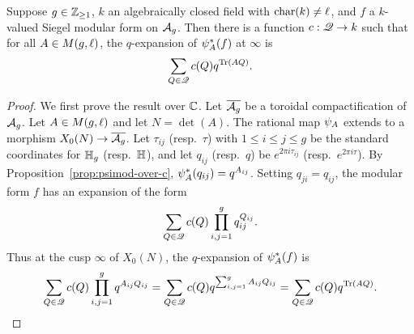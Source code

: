 \documentclass{amsart}
\begin{document}
\begin{proposition}\label{prop:q-expansion}
  Suppose  $g \in \mathbb{Z}_{\ge 1}$, $k$ an algebraically closed field with $\operatorname{char}(k) \neq \ell$, %
  and $f$ a $k$-valued Siegel modular form on $\mathcal{A}_g$.
  Then there is a function  $c : \mathscr{Q} \to k$ such that for all %
  $A \in M(g,\ell)$, the $q$-expansion of
  $\psi_{A}^*(f)$ at $\infty$ is
  \begin{equation}
    \sum_{Q \in \mathscr{Q}} c(Q) q^{\operatorname{Tr}(AQ)}.\label{eq:q}
  \end{equation}
\end{proposition}

\begin{proof}
  We first prove the result over $\mathbb{C}$. Let $\overline{\mathcal{A}_g}$ be a toroidal compactification of $\mathcal{A}_g$. Let $A \in M(g,\ell)$ and let $N=\det(A)$. The rational map $\psi_{A}$ extends to a morphism $X_0(N) \to \overline{\mathcal{A}_g}$. Let $\tau_{ij}$ (resp.~$\tau$) with $1 \leq i \leq j \leq g$ be the standard coordinates for $\mathbb{H}_g$ (resp.~$\mathbb{H}$), and let $q_{ij}$ (resp.~$q$) be $e^{2\pi i \tau_{ij}}$ (resp.~$e^{2\pi i \tau}$). By Proposition~\ref{prop:psimod-over-c}, $\psi_{A}^*(q_{ij}) = q^{A_{ij}}$. Setting $q_{ji} = q_{ij}$, the modular form $f$ has an expansion of the form
    \[
      \sum_{Q \in \mathscr{Q}} c(Q) \prod_{i,j=1}^g q_{ij}^{Q_{ij}}.
    \]
    Thus at the cusp $\infty$ of $X_0(N)$, the $q$-expansion of $\psi_{A}^*(f)$ is
    $$\sum_{Q \in \mathscr{Q}} c(Q) \prod_{i,j=1}^g q^{A_{ij}Q_{ij}} = \sum_{Q \in \mathscr{Q}} c(Q) q^{\sum_{i,j=1}^g A_{ij}Q_{ij}}
    = \sum_{Q \in \mathscr{Q}} c(Q) q^{\operatorname{Tr}(AQ)}.$$


\end{proof}
\end{document}
